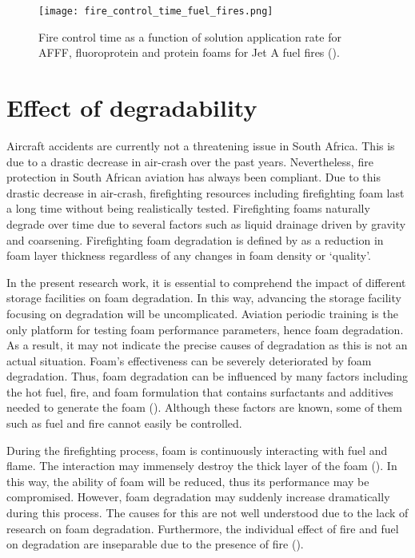 \begin{figure}[H]
    \centering
    \texttt{[image: fire\_control\_time\_fuel\_fires.png]}
    \caption{Fire control time as a function of solution application rate for AFFF, fluoroprotein and protein foams for Jet A fuel fires (\cite{geyer1972evaluation}).}
    \label{ch2:figure:fuel}
\end{figure}

\section{Effect of degradability}
Aircraft accidents are currently not a threatening issue in South Africa. This is due to a drastic decrease in air-crash over the past years. Nevertheless, fire protection in South African aviation has always been compliant. Due to this drastic decrease in air-crash, firefighting resources including firefighting foam last a long time without being realistically tested. Firefighting foams naturally degrade over time due to several factors such as liquid drainage driven by gravity and coarsening. Firefighting foam degradation is defined by \cite{hinnant2017influence} as a reduction in foam layer thickness regardless of any changes in foam density or ‘quality’. 

In the present research work, it is essential to comprehend the impact of different storage facilities on foam degradation. In this way, advancing the storage facility focusing on degradation will be uncomplicated. Aviation periodic training is the only platform for testing foam performance parameters, hence foam degradation. As a result, it may not indicate the precise causes of degradation as this is not an actual situation. Foam’s effectiveness can be severely deteriorated by foam degradation. Thus, foam degradation can be influenced by many factors including the hot fuel, fire, and foam formulation that contains surfactants and additives needed to generate the foam (\cite{hinnant2017influence}). Although these factors are known, some of them such as fuel and fire cannot easily be controlled.     

During the firefighting process, foam is continuously interacting with fuel and flame. The interaction may immensely destroy the thick layer of the foam (\cite{osei2015foam}). In this way, the ability of foam will be reduced, thus its performance may be compromised. However, foam degradation may suddenly increase dramatically during this process.  The causes for this are not well understood due to the lack of research on foam degradation. Furthermore, the individual effect of fire and fuel on degradation are inseparable due to the presence of fire (\cite{hinnant2017influence}).  

